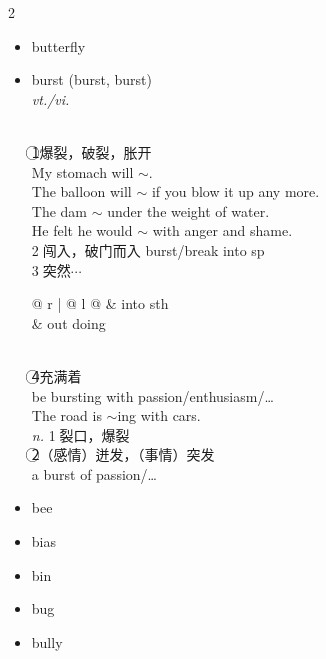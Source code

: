 \documentclass[../../book.tex]{subfiles}
\begin{document}
\begin{multicols}{2}
\begin{itemize}
\item[-] butterfly
\item[-] burst (burst, burst)
\\\emph{vt./vi.} { \small
\\\textcircled{1}爆裂，破裂，胀开
\\ My stomach will $\sim$.
\\ The balloon will $\sim$ if you blow it up any more.
\\ The dam $\sim$ under the weight of water.
\\ He felt he would $\sim$ with anger and shame.
\\\textcircled{2}闯入，破门而入 burst/break into sp
\\\textcircled{3}突然$\cdots$ 
\begin{tabular}{@{} r | @{\hspace{0.1em}} l @{}}
 & into sth
\\& out doing
\end{tabular}
\\\textcircled{4}充满着
\\be bursting with passion/enthusiasm/\ldots
\\The road is $\sim$ing with cars.
\\\emph{n.} \textcircled{1}裂口，爆裂
\\\textcircled{2}（感情）迸发，（事情）突发
\\a burst of passion/\ldots
}
\item[-] bee
\item[-] bias
\item[-] bin
\item[-] bug
\item[-] bully
\end{itemize}
\end{multicols}
\end{document}
